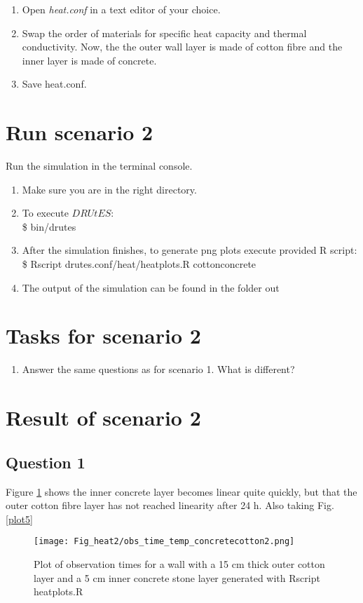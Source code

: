 \begin{enumerate}
\item Open \emph{heat.conf} in a text editor of your choice. 
\item Swap the order of materials for specific heat capacity and thermal conductivity. Now, the the outer wall layer is made of cotton fibre and the inner layer is made of concrete.
\item Save heat.conf.
\end{enumerate}

\section*{Run scenario 2}
Run the simulation in the terminal console.
\begin{enumerate}
\item Make sure you are in the right directory. 
\item To execute $DRUtES$: \\
\$ bin/drutes
\item After the simulation finishes, to generate png plots execute provided R script: \\
\$ Rscript drutes.conf/heat/heatplots.R cottonconcrete
\item The output of the simulation can be found in the folder out

\end{enumerate}

\section*{Tasks for scenario 2}

\begin{enumerate}
\item Answer the same questions as for scenario 1. What is different?
\end{enumerate}

\section*{Result of scenario 2}
\subsection*{Question 1}
Figure \ref{plot4} shows the inner concrete layer becomes linear quite quickly, but that the outer cotton fibre layer has not reached linearity after 24 h. Also taking Fig. \ref{plot5} 
\begin{figure}[!h]
\centering
\texttt{[image: Fig\_heat2/obs\_time\_temp\_concretecotton2.png]}
\caption{\label{plot4}Plot of observation times for a wall with a 15 cm thick outer cotton layer and a 5 cm inner concrete stone layer generated with Rscript heatplots.R}
\end{figure}

